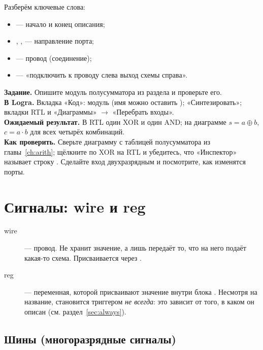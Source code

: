 Разберём ключевые слова:
\begin{itemize}
  \item {} --- начало и конец описания;
  \item {}, ,  --- направление порта;
  \item {} --- провод (соединение);
  \item {} --- «подключить к проводу слева выход схемы справа».
\end{itemize}

\begin{diybox}
\textbf{Задание.} Опишите модуль полусумматора из раздела и проверьте его.\\
\textbf{В Logra.} Вкладка «Код»: модуль  (имя можно оставить ); «Синтезировать»; вкладки RTL и «Диаграммы» $\to$ «Перебрать входы».\\
\textbf{Ожидаемый результат.} В RTL один XOR и один AND; на диаграмме $s=a\oplus b$, $c=a\cdot b$ для всех четырёх комбинаций.\\
\textbf{Как проверить.} Сверьте диаграмму с таблицей полусумматора из главы~\ref{ch:arith}; щёлкните по XOR на RTL и убедитесь, что «Инспектор» называет строку .  Сделайте вход  двухразрядным и посмотрите, как изменятся порты.
\end{diybox}

\section{Сигналы: wire и reg}

\begin{description}
  \item[wire] --- провод. Не хранит значение, а лишь передаёт то, что на него
    подаёт какая-то схема. Присваивается через .
  \item[reg] --- переменная, которой присваивают значение внутри блока
    . Несмотря на название,  становится триггером
    \emph{не всегда}: это зависит от того, в каком  он описан (см.
    раздел~\ref{sec:always}).
\end{description}

\subsection{Шины (многоразрядные сигналы)}

